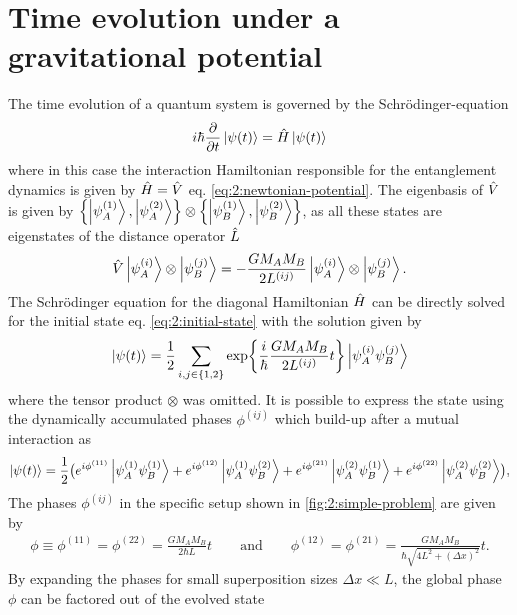 \section{Time evolution under a gravitational potential}\label{sec:2:time-evolution}

The time evolution of a quantum system is governed by the Schrödinger-equation
\begin{equation}
  i\hbar \pdv{t} \ket{\psi(t)} = \hat{H} \ket{\psi(t)}
\end{equation}
where in this case the interaction Hamiltonian responsible for the entanglement dynamics is given by $\hat{H} = \hat{V}$ eq. \eqref{eq:2:newtonian-potential}.
The eigenbasis of $\hat{V}$ is given by $\left\{ \ket{\psi_A^{(1)}}, \ket{\psi_A^{(2)}} \right\}\otimes \left\{ \ket{\psi_B^{(1)}}, \ket{\psi_B^{(2)}} \right\}$, as all these states are eigenstates of the distance operator $\hat{L}$
\begin{equation}
  \hat{V} \ket{\psi^{(i)}_A} \otimes \ket{\psi^{(j)}_B} = -\frac{G M_A M_B}{2L^{(ij)}} \ket{\psi^{(i)}_A} \otimes \ket{\psi^{(j)}_B} .
\end{equation}
The Schrödinger equation for the diagonal Hamiltonian $\hat{H}$ can be directly solved for the initial state eq. \eqref{eq:2:initial-state} with the solution given by 
\begin{equation}
  \ket{\psi(t)} = \frac{1}{2} \sum_{i,j\in\{1,2\}} \exp{\frac{i}{\hbar} \frac{G M_A M_B}{2L^{(ij)}} t} \ket{\psi^{(i)}_A \psi^{(j)}_B}
\end{equation}
where the tensor product $\otimes$ was omitted.
It is possible to express the state using the dynamically accumulated phases $\phi^{(ij)}$ which build-up after a mutual interaction as
\begin{equation}\label{eq:2:evolved-state}
  \ket{\psi(t)} = \frac{1}{2}\bigl(
    e^{i\phi^{(11)}} \ket{\psi_A^{(1)} \psi_B^{(1)}} 
    + e^{i\phi^{(12)}} \ket{\psi_A^{(1)} \psi_B^{(2)}}
    + e^{i\phi^{(21)}} \ket{\psi_A^{(2)} \psi_B^{(1)}} 
    + e^{i\phi^{(22)}} \ket{\psi_A^{(2)} \psi_B^{(2)}} \bigr) ,
\end{equation}
The phases $\phi^{(ij)}$ in the specific setup shown in \cref{fig:2:simple-problem} are given by
\begin{align}
  \phi \equiv \phi^{(11)} = \phi^{(22)} = \frac{G M_A M_B}{2\hbar L}t 
  \qquad \text{and} \qquad 
  \phi^{(12)} = \phi^{(21)} = \frac{G M_A M_B}{\hbar \sqrt{4L^2 + (\Delta x)^2}}t .
\end{align}
By expanding the phases for small superposition sizes $\Delta x \ll L$, the global phase $\phi$ can be factored out of the evolved state

